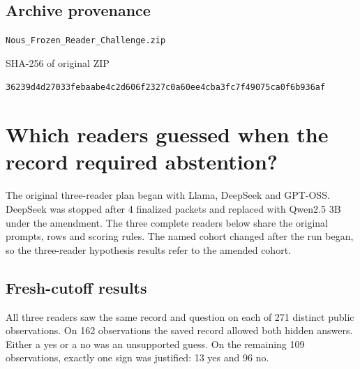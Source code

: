 \documentclass[11pt,letterpaper]{article}
\begin{document}
\subsection*{Archive provenance}

\nolinkurl{Nous_Frozen_Reader_Challenge.zip}\par

\small\sffamily SHA-256 of original ZIP\par\normalfont\small\nolinkurl{36239d4d27033febaabe4c2d606f2327c0a60ee4cba3fc7f49075ca0f6b936af}\par

\clearpage\normalsize\tableofcontents\clearpage{}

\section*{Which readers guessed when the record required abstention?}

The original three-reader plan began with Llama, DeepSeek and GPT-OSS. DeepSeek was stopped after 4 finalized packets and replaced with Qwen2.5 3B under the amendment. The three complete readers below share the original prompts, rows and scoring rules. The named cohort changed after the run began, so the three-reader hypothesis results refer to the amended cohort.


\subsection{Fresh-cutoff results}

All three readers saw the same record and question on each of 271 distinct public observations. On 162 observations the saved record allowed both hidden answers. Either a yes or a no was an unsupported guess. On the remaining 109 observations, exactly one sign was justified: 13 yes and 96 no.
\end{document}
